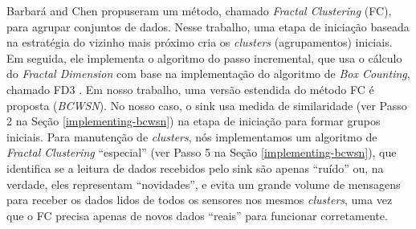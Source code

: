 \documentclass{acm_proc_article-sp}
\begin{document}
Barbará and Chen \cite{Barbara2000} propuseram um método, chamado {\it Fractal
Clustering} (FC), para agrupar conjuntos de dados.
Nesse trabalho, uma etapa de iniciação baseada na estratégia do vizinho mais
próximo cria os {\it clusters} (agrupamentos) iniciais. Em seguida, ele implementa o
algoritmo do passo incremental, que usa o cálculo do \textit{Fractal Dimension}
com base na implementação do algoritmo de \textit{Box Counting}, chamado FD3
\cite{Liebovitch1989}. Em nosso trabalho, uma versão estendida do método FC é
proposta ({\it BCWSN}). No nosso caso, o sink usa medida de similaridade (ver Passo 2
na Seção \ref{implementing-bcwsn}) na etapa de iniciação para formar grupos
iniciais. Para manutenção de {\it clusters}, nós implementamos um algoritmo de {\it Fractal
Clustering} “especial” (ver Passo 5 na Seção \ref{implementing-bcwsn}), que
identifica se a leitura de dados recebidos pelo sink são apenas ``ruído'' ou, na
verdade, eles representam ``novidades'', e evita um grande volume de mensagens
para receber os dados lidos de todos os sensores nos mesmos {\it clusters}, uma vez
que o FC precisa apenas de novos dados ``reais'' para funcionar corretamente.
\vspace*{-.3cm}
\end{document}
